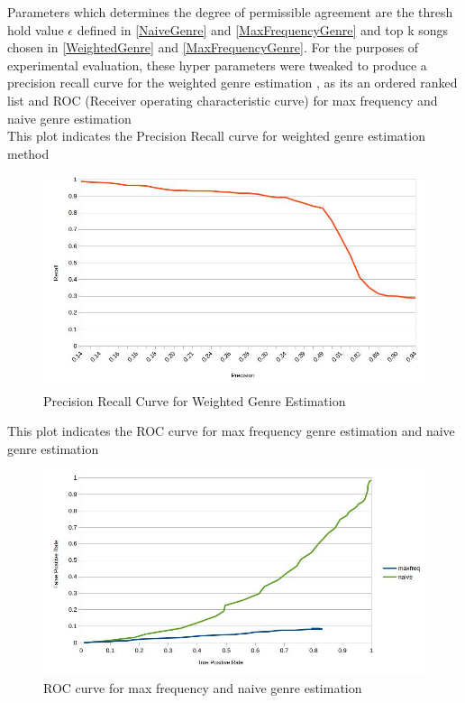 Parameters which determines the degree of permissible agreement are the thresh hold value $\epsilon$ defined in \ref{NaiveGenre} and \ref{MaxFrequencyGenre} and top k songs chosen in \ref{WeightedGenre} and \ref{MaxFrequencyGenre}. For the purposes of experimental evaluation, these hyper parameters were tweaked to produce a precision recall curve for the weighted genre estimation , as its an ordered ranked list and ROC (Receiver operating characteristic curve) for max frequency and naive genre estimation \\
\noindent This plot indicates the Precision Recall curve for weighted genre estimation method

\begin{figure}
\centering
\includegraphics[width=\textwidth]{precRec.jpg}
\makeatletter
\let\@currsize\normalsize
\caption{Precision Recall Curve for Weighted Genre Estimation}
\label{fig:precRec}
\end{figure}

\noindent This plot indicates the ROC curve for max frequency genre estimation and naive genre estimation
\begin{figure}
\centering
\includegraphics[width=\textwidth]{roc.jpg}
\makeatletter
\let\@currsize\normalsize
\caption{ROC curve for max frequency and naive genre estimation}
\label{fig:roccurve}
\end{figure}


